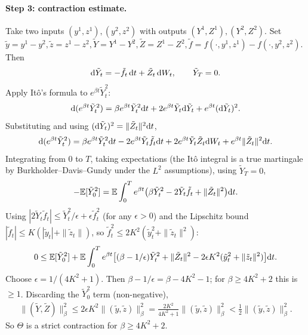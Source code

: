 \paragraph{Step 3: contraction estimate.}  Take two inputs $(y^1, z^1), (y^2, z^2)$ with outputs $(Y^1, Z^1), (Y^2, Z^2)$. Set $\tilde y = y^1 - y^2, \tilde z = z^1 - z^2, \tilde Y = Y^1 - Y^2, \tilde Z = Z^1 - Z^2, \tilde f = f(\cdot, y^1, z^1) - f(\cdot, y^2, z^2)$. Then
\begin{equation}
  \mathrm{d} \tilde Y_t = -\tilde f_t \, \mathrm{d} t + \tilde Z_t \, \mathrm{d} W_t, \qquad \tilde Y_T = 0.
\end{equation}
Apply It\^o's formula to $e^{\beta t} \tilde Y_t^2$:
\begin{equation}
  \mathrm{d}(e^{\beta t} \tilde Y_t^2) = \beta e^{\beta t} \tilde Y_t^2 \mathrm{d} t + 2 e^{\beta t} \tilde Y_t \mathrm{d} \tilde Y_t + e^{\beta t} (\mathrm{d} \tilde Y_t)^2.
\end{equation}
Substituting and using $(\mathrm{d} \tilde Y_t)^2 = \|\tilde Z_t\|^2 \mathrm{d} t$,
\begin{multline*}
  \mathrm{d}(e^{\beta t} \tilde Y_t^2) = \beta e^{\beta t} \tilde Y_t^2 \mathrm{d} t - 2 e^{\beta t} \tilde Y_t \tilde f_t \mathrm{d} t + 2 e^{\beta t} \tilde Y_t \tilde Z_t \mathrm{d} W_t + e^{\beta t} \|\tilde Z_t\|^2 \mathrm{d} t.
\end{multline*}
Integrating from $0$ to $T$, taking expectations (the It\^o integral is a true martingale by Burkholder--Davis--Gundy under the $L^2$ assumptions), using $\tilde Y_T = 0$,
\begin{equation}
  -\mathbb{E}[\tilde Y_0^2] = \mathbb{E} \int_0^T e^{\beta t} \bigl(\beta \tilde Y_t^2 - 2 \tilde Y_t \tilde f_t + \|\tilde Z_t\|^2\bigr) \mathrm{d} t.
\end{equation}
Using $|2 \tilde Y_t \tilde f_t| \leq \tilde Y_t^2 / \epsilon + \epsilon \tilde f_t^2$ (for any $\epsilon > 0$) and the Lipschitz bound $|\tilde f_t| \leq K(|\tilde y_t| + \|\tilde z_t\|)$, so $\tilde f_t^2 \leq 2 K^2 (\tilde y_t^2 + \|\tilde z_t\|^2)$:
\begin{multline*}
  0 \leq \mathbb{E}[\tilde Y_0^2] + \mathbb{E} \int_0^T e^{\beta t} \bigl[(\beta - 1/\epsilon) \tilde Y_t^2 + \|\tilde Z_t\|^2 - 2 \epsilon K^2 (\tilde y_t^2 + \|\tilde z_t\|^2)\bigr] \mathrm{d} t.
\end{multline*}
Choose $\epsilon = 1/(4 K^2 + 1)$. Then $\beta - 1/\epsilon = \beta - 4 K^2 - 1$; for $\beta \geq 4 K^2 + 2$ this is $\geq 1$. Discarding the $\tilde Y_0^2$ term (non-negative),
\begin{multline*}
  \|(\tilde Y, \tilde Z)\|_\beta^2 \leq 2 \epsilon K^2 \|(\tilde y, \tilde z)\|_\beta^2 = \frac{2 K^2}{4 K^2 + 1} \|(\tilde y, \tilde z)\|_\beta^2 < \frac{1}{2} \|(\tilde y, \tilde z)\|_\beta^2.
\end{multline*}
So $\Theta$ is a strict contraction for $\beta \geq 4 K^2 + 2$.

